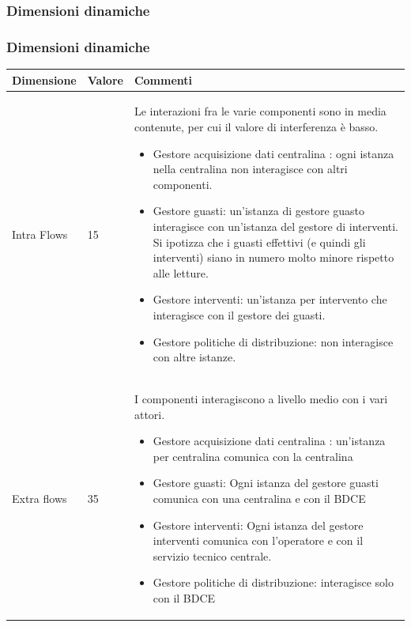 \documentclass{beamer}
\begin{document}
	\subsubsection{Dimensioni dinamiche}
	\begin{frame}[allowframebreaks]
		\frametitle{Dimensioni dinamiche}			
		\begin{center}
			\begin{table}
				\tiny
				\centering
				{\renewcommand{\arraystretch}{1.2}
					
					\begin{tabular}{|M{0.1\textwidth}|M{0.1\textwidth}|p{.6\textwidth}|}
						\hline
						Dimensione & Valore & Commenti \\
						\hline
						Intra Flows & 15 & Le interazioni fra le varie componenti sono in media contenute, per cui il valore di interferenza è basso.
						\begin{itemize}
							\item Gestore acquisizione dati centralina : ogni istanza nella centralina non interagisce con altri componenti.
							\item Gestore guasti: un'istanza di gestore guasto interagisce con un'istanza del gestore di interventi. Si ipotizza che i guasti effettivi (e quindi gli interventi) siano in numero molto minore rispetto alle letture.
							\item Gestore interventi: un'istanza per intervento che interagisce con il gestore dei guasti.
							\item Gestore politiche di distribuzione: non interagisce con altre istanze.
						\end{itemize} \\
						Extra flows & 35 & I componenti interagiscono a livello medio con i vari attori.
						\begin{itemize}
							\item Gestore acquisizione dati centralina : un'istanza per centralina comunica con la centralina
							\item Gestore guasti: Ogni istanza del gestore guasti comunica con una centralina e con il BDCE
							\item Gestore interventi: Ogni istanza del gestore interventi comunica con l'operatore e con il servizio tecnico centrale.
							\item Gestore politiche di distribuzione: interagisce solo con il BDCE
						\end{itemize} \\
						\hline
				\end{tabular}}
			\end{table}
		\end{center}
		

\end{frame}
\end{document}
